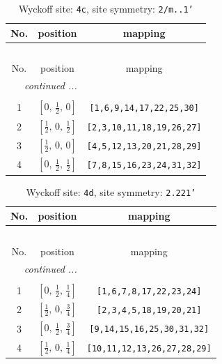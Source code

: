 \documentclass[fleqn,8pt]{jsarticle}
\begin{document}
\renewcommand{\arraystretch}{1.2}
\begin{longtable}{ccc}
\caption{Wyckoff site: {\tt 4c}, site symmetry: {\tt 2/m..1'}}
 \\
 \hline \hline
No. & position & mapping \\ \hline \endfirsthead

\multicolumn{2}{l}{\tablename\ \thetable{}} \\
 \hline \hline
No. & position & mapping \\ \hline \endhead

 \hline \hline
\multicolumn{2}{r}{\footnotesize\it continued ...} \\ \endfoot

 \hline \hline
\multicolumn{2}{r}{} \\ \endlastfoot

1 & $\left[ 0,\, \frac{1}{2},\, 0 \right]$ & {\tt [1,6,9,14,17,22,25,30]} \\ \hline
2 & $\left[ \frac{1}{2},\, 0,\, \frac{1}{2} \right]$ & {\tt [2,3,10,11,18,19,26,27]} \\ \hline
3 & $\left[ \frac{1}{2},\, 0,\, 0 \right]$ & {\tt [4,5,12,13,20,21,28,29]} \\ \hline
4 & $\left[ 0,\, \frac{1}{2},\, \frac{1}{2} \right]$ & {\tt [7,8,15,16,23,24,31,32]} \\
\end{longtable}
\renewcommand{\arraystretch}{1.2}
\begin{longtable}{ccc}
\caption{Wyckoff site: {\tt 4d}, site symmetry: {\tt 2.221'}}
 \\
 \hline \hline
No. & position & mapping \\ \hline \endfirsthead

\multicolumn{2}{l}{\tablename\ \thetable{}} \\
 \hline \hline
No. & position & mapping \\ \hline \endhead

 \hline \hline
\multicolumn{2}{r}{\footnotesize\it continued ...} \\ \endfoot

 \hline \hline
\multicolumn{2}{r}{} \\ \endlastfoot

1 & $\left[ 0,\, \frac{1}{2},\, \frac{1}{4} \right]$ & {\tt [1,6,7,8,17,22,23,24]} \\ \hline
2 & $\left[ \frac{1}{2},\, 0,\, \frac{3}{4} \right]$ & {\tt [2,3,4,5,18,19,20,21]} \\ \hline
3 & $\left[ 0,\, \frac{1}{2},\, \frac{3}{4} \right]$ & {\tt [9,14,15,16,25,30,31,32]} \\ \hline
4 & $\left[ \frac{1}{2},\, 0,\, \frac{1}{4} \right]$ & {\tt [10,11,12,13,26,27,28,29]} \\
\end{longtable}
\end{document}

